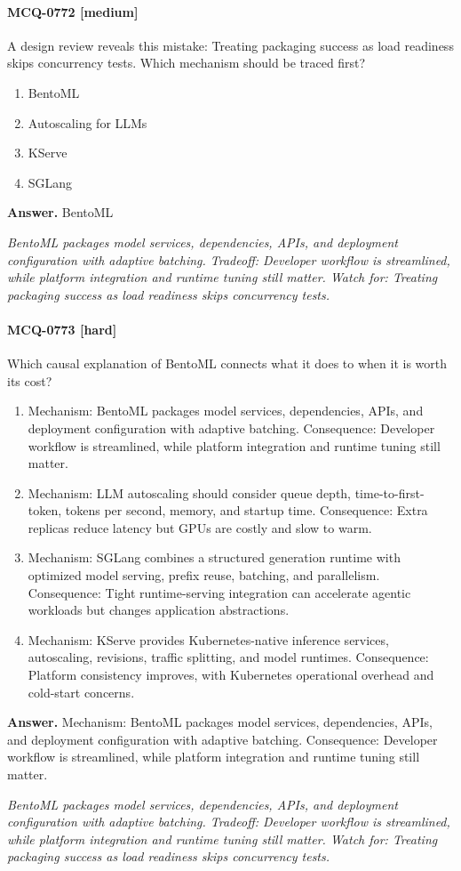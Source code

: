 \paragraph{MCQ-0772 [medium]} A design review reveals this mistake: Treating packaging success as load readiness skips concurrency tests. Which mechanism should be traced first?
\begin{enumerate}[label=\Alph*.]
\item BentoML
\item Autoscaling for LLMs
\item KServe
\item SGLang
\end{enumerate}
\noindent\textbf{Answer.} BentoML
\par\textit{BentoML packages model services, dependencies, APIs, and deployment configuration with adaptive batching. Tradeoff: Developer workflow is streamlined, while platform integration and runtime tuning still matter. Watch for: Treating packaging success as load readiness skips concurrency tests.}
\paragraph{MCQ-0773 [hard]} Which causal explanation of BentoML connects what it does to when it is worth its cost?
\begin{enumerate}[label=\Alph*.]
\item Mechanism: BentoML packages model services, dependencies, APIs, and deployment configuration with adaptive batching. Consequence: Developer workflow is streamlined, while platform integration and runtime tuning still matter.
\item Mechanism: LLM autoscaling should consider queue depth, time-to-first-token, tokens per second, memory, and startup time. Consequence: Extra replicas reduce latency but GPUs are costly and slow to warm.
\item Mechanism: SGLang combines a structured generation runtime with optimized model serving, prefix reuse, batching, and parallelism. Consequence: Tight runtime-serving integration can accelerate agentic workloads but changes application abstractions.
\item Mechanism: KServe provides Kubernetes-native inference services, autoscaling, revisions, traffic splitting, and model runtimes. Consequence: Platform consistency improves, with Kubernetes operational overhead and cold-start concerns.
\end{enumerate}
\noindent\textbf{Answer.} Mechanism: BentoML packages model services, dependencies, APIs, and deployment configuration with adaptive batching. Consequence: Developer workflow is streamlined, while platform integration and runtime tuning still matter.
\par\textit{BentoML packages model services, dependencies, APIs, and deployment configuration with adaptive batching. Tradeoff: Developer workflow is streamlined, while platform integration and runtime tuning still matter. Watch for: Treating packaging success as load readiness skips concurrency tests.}
